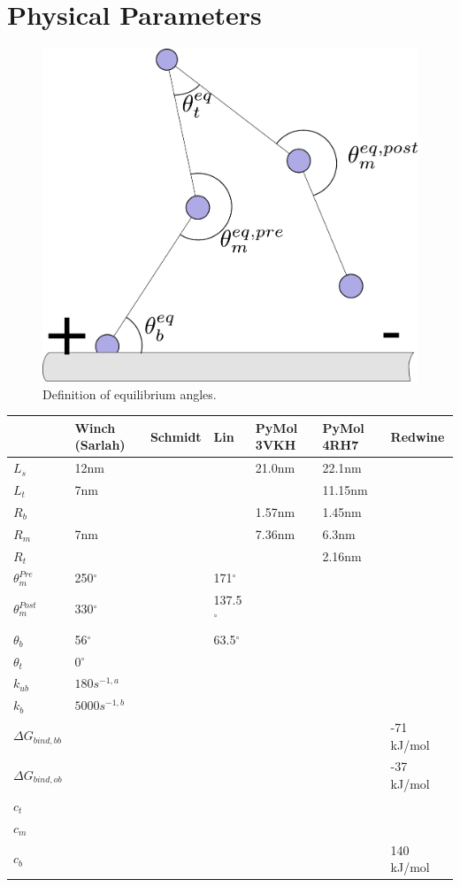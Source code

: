 \documentclass[10pt]{article} %
\begin{document}
\section{Physical Parameters}

\begin{figure}
  \centering
  \includegraphics[width=.45\textwidth]{../figures/equilibrium-onebound}
  \caption{Definition of equilibrium angles.}
  \label{fig:eq_angles}
\end{figure}

\begin{center}
  \begin{tabular}{| l | l | l | l | l | l | l |}
    \hline
    & Winch (Sarlah) & Schmidt & Lin & PyMol 3VKH & PyMol 4RH7 & Redwine\\\hline
    $L_s$ & 12nm & & & 21.0nm & 22.1nm &\\ \hline
    $L_t$ &  7nm & & & & 11.15nm &\\ \hline
    $R_b$ &  & & & 1.57nm & 1.45nm &\\ \hline
    $R_m$ &  7nm & & & 7.36nm & 6.3nm &\\ \hline
    $R_t$ &  & & & & 2.16nm & \\ \hline
    $\theta_{m}^{Pre}$ & 250$^{\circ}$ & & 171$^{\circ}$ & & & \\ \hline
    $\theta_{m}^{Post}$ & 330$^{\circ}$ & & 137.5$^{\circ}$ & & &\\ \hline
    $\theta_{b}$ & 56$^{\circ}$ & & 63.5$^{\circ}$ & & &\\ \hline
    $\theta_{t}$ & 0$^{\circ}$ & & & & &\\ \hline
    $k_{ub}$ & $180 s^{-1,a}$ & & & & &\\ \hline
    $k_b$ & $5000 s^{-1,b}$ & & & & &\\ \hline
    $\Delta G_{bind, bb}$ & & & & & & -71 kJ/mol\\ \hline
    $\Delta G_{bind, ob}$ & & & & & & -37 kJ/mol\\ \hline
    $c_t$ & & & & & & \\ \hline
    $c_m$ & & & & & & \\ \hline
    $c_b$ & & & & & & 140 kJ/mol\\ \hline
  \end{tabular}
\end{center}
\end{document}

